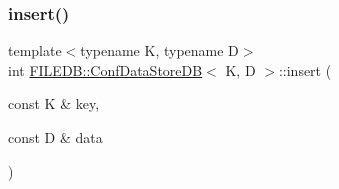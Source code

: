 \subsubsection{\texorpdfstring{insert()}{insert()}\hspace{0.1cm}{\footnotesize\ttfamily [3/3]}}
{\footnotesize\ttfamily template$<$typename K, typename D$>$ \\
int \mbox{\hyperlink{classFILEDB_1_1ConfDataStoreDB}{F\+I\+L\+E\+D\+B\+::\+Conf\+Data\+Store\+DB}}$<$ K, D $>$\+::insert (\begin{DoxyParamCaption}\item[{const K \&}]{key,  }\item[{const D \&}]{data }\end{DoxyParamCaption})\hspace{0.3cm}{\ttfamily [inline]}}

